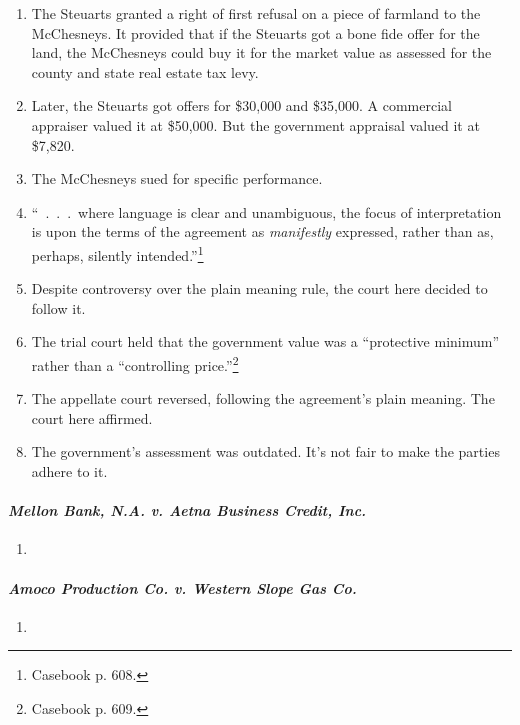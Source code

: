 \begin{enumerate}
    \item The Steuarts granted a right of first refusal on a piece of farmland 
    to the McChesneys. It provided that if the Steuarts got a bone fide offer 
    for the land, the McChesneys could buy it for the market value as assessed 
    for the county and state real estate tax levy.
    \item Later, the Steuarts got offers for \$30,000 and \$35,000. A 
    commercial appraiser valued it at \$50,000. But the government appraisal 
    valued it at \$7,820.
    \item The McChesneys sued for specific performance.
    \item ``~.~.~.~where language is clear and unambiguous, the focus of 
    interpretation is upon the terms of the agreement as \emph{manifestly} 
    expressed, rather than as, perhaps, silently intended.''\footnote{Casebook 
    p. 608.}
    \item Despite controversy over the plain meaning rule, the court here 
    decided to follow it.
    \item The trial court held that the government value was a ``protective 
    minimum'' rather than a ``controlling price.''\footnote{Casebook p. 609.}
    \item The appellate court reversed, following the agreement's plain 
    meaning. The court here affirmed.
    \item The government's assessment was outdated. It's not fair to make the 
    parties adhere to it.
\end{enumerate}

\paragraph{\emph{Mellon Bank, N.A. v. Aetna Business Credit, Inc.}}

\begin{enumerate}
    \item %
\end{enumerate}

\paragraph{\emph{Amoco Production Co. v. Western Slope Gas Co.}}

\begin{enumerate}
    \item %
\end{enumerate}

